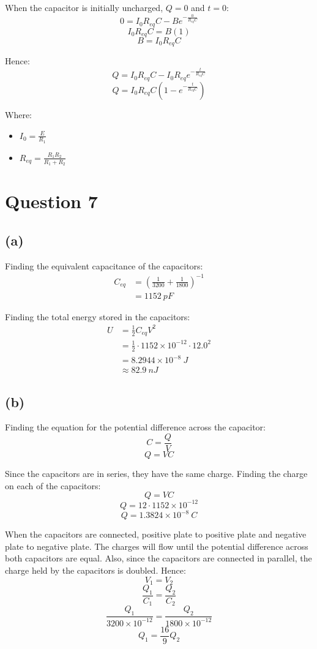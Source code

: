 \documentclass[11pt]{article}
\begin{document}
When the capacitor is initially uncharged, \(Q = 0\) and \(t = 0\):
\[0 = I_0 R_{eq} C - Be^{- \frac{0}{R_{eq} C}}\]
\[I_0 R_{eq} C = B(1)\]
\[B = I_0 R_{eq} C\]

Hence:
\[Q = I_0 R_{eq} C - I_0 R_{eq} e^{- \frac{t}{R_{eq} C}}\]
\[Q = I_0 R_{eq} C \left(1 - e^{- \frac{t}{R_{eq} C}} \right)\]

Where:
\begin{itemize}
\item \(I_0 = \frac{E}{R_1}\)
\item \(R_{eq} = \frac{R_1 R_2}{R_1 + R_2}\)
\end{itemize}


\section{Question 7}
\label{sec:org2086fe8}

\subsection{(a)}
\label{sec:orga9f64ef}
Finding the equivalent capacitance of the capacitors:
\begin{align*}
C_{eq} &= \left( \frac{1}{3200} + \frac{1}{1800} \right)^{-1} \\
&= \qty{1152}{\unit{pF}}
\end{align*}

Finding the total energy stored in the capacitors:
\begin{align*}
U &= \frac{1}{2} C_{eq} V^2 \\
&= \frac{1}{2} \cdot 1152 \times 10^{-12} \cdot 12.0^2 \\
&= 8.2944 \times 10^{-8} \ \unit{J} \\
&\approx \qty{82.9}{\unit{nJ}}
\end{align*}

\subsection{(b)}
\label{sec:org3a4860d}
Finding the equation for the potential difference across the capacitor:
\[C = \frac{Q}{V}\]
\[Q = VC\]

Since the capacitors are in series, they have the same charge. Finding the charge on each of the capacitors:
\[Q = VC\]
\[Q = 12 \cdot 1152 \times 10^{-12}\]
\[Q = 1.3824 \times 10^{-8} \ \unit{C}\]

When the capacitors are connected, positive plate to positive plate and negative plate to negative plate. The charges will flow until the potential difference across both capacitors are equal. Also, since the capacitors are connected in parallel, the charge held by the capacitors is doubled. Hence:
\[V_1 = V_2\]
\[\frac{Q_1}{C_1} = \frac{Q_2}{C_2}\]
\[\frac{Q_1}{3200 \times 10^{-12}} = \frac{Q_2}{1800 \times 10^{-12}}\]
\[Q_1 = \frac{16}{9}Q_2 \tag{1}\]
\end{document}
